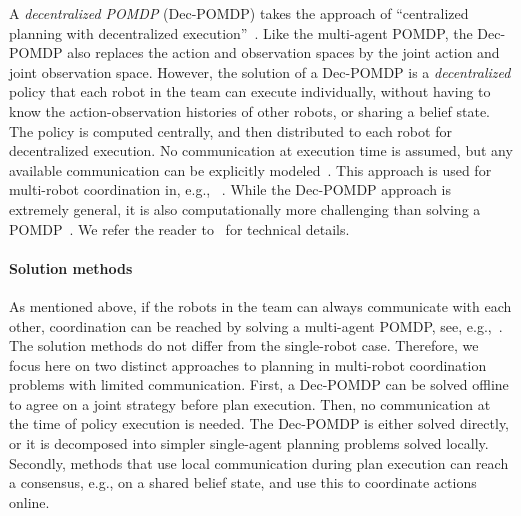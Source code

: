 \documentclass[journal]{IEEEtran}
\begin{document}
A \emph{decentralized POMDP} (Dec-POMDP) takes the approach of ``centralized planning with decentralized execution''~\cite{oliehoek2016concise}.
Like the multi-agent POMDP, the Dec-POMDP also replaces the action and observation spaces by the joint action and joint observation space.
However, the solution of a Dec-POMDP is a \emph{decentralized} policy that each robot in the team can execute individually, without having to know the action-observation histories of other robots{, or sharing a belief state}.
The policy is computed centrally, and then distributed to each robot for decentralized execution.
No communication at execution time is assumed, but any available communication can be explicitly modeled~\cite[Sec.~8.3]{oliehoek2016concise}.
This approach is used for multi-robot coordination in, e.g., ~\cite{omidshafiei2015decentralized,omidshafiei2017decentralized,amato2016policy,lauri2017multi}.
While the Dec-POMDP approach is extremely {general}, it is also computationally more challenging than solving a POMDP~\cite{bernstein2002complexity}.
%
We refer the reader to~\cite{oliehoek2016concise} for technical details.

\paragraph{Solution methods}
As mentioned above, if the robots in the team can always communicate with each other, coordination can be reached by solving a multi-agent POMDP, see, e.g.,~\cite{spaan2008cooperative,spaan2010active,ahmadi2019safe,corah2019distributed,viseras2019deepig,yi2019indoor,bhattacharya2020multiagent}.
The solution methods do not differ from the single-robot case.
Therefore, we focus here on two distinct approaches to planning in multi-robot coordination problems with limited communication.
First, a Dec-POMDP can be solved offline to agree on a joint strategy before plan execution.
Then, no communication at the time of policy execution is needed.
The Dec-POMDP is either solved directly, or it is decomposed into simpler single-agent planning problems solved locally.
Secondly, methods that use local communication during plan execution can reach a consensus, e.g., on a shared belief state, and use this to coordinate actions online.
\end{document}
